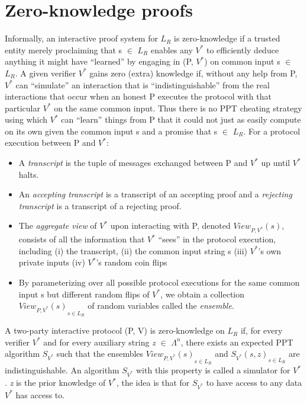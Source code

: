 \documentclass[a4paper]{article}
\newcommand{\quotes}[1]{``#1''}
\begin{document}
\section{Zero-knowledge proofs}
Informally, an interactive proof system for \textit{$L_R$} is zero-knowledge if a trusted entity merely proclaiming that s $\in$ \textit{$L_R$} enables any \textit{$V^{*}$} to efficiently deduce anything it might have \quotes{learned} by engaging in (P, ${V^{*}}$) on common input s $\in$ \textit{$L_R$}. A given verifier ${V^{*}}$ gains zero (extra) knowledge if, without any help from P, ${V^{*}}$ can \quotes{simulate} an interaction that is \quotes{indistinguishable} from the real interactions that occur when an honest P executes the protocol with that particular ${V^{*}}$ on the same common input. Thus there is no PPT cheating strategy using which ${V^{*}}$ can \quotes{learn} things from P that it could not just as easily compute on its own given the common input s and a promise that s $\in$ \textit{$L_R$}.
\newline
For a protocol execution between P and ${V^{*}}$: 
\begin{itemize}
  \item A \emph{transcript} is the tuple of messages exchanged between P and ${V^{*}}$ up until ${V^{*}}$ halts. 
  \item An \emph{accepting transcript} is a transcript of an accepting proof and a \emph{rejecting transcript} is a transcript of a rejecting proof.
  \item The \emph{aggregate view} of ${V^{*}}$ upon interacting with P, denoted $View_{P,V^{*}}(s)$, consists of all the information that ${V^{*}}$ \quotes{sees} in the protocol execution, including (i) the transcript, (ii) the common input string s (iii) ${V^{*}}$’s own private inputs (iv) ${V^{*}}$’s random coin flips  
  \item By parameterizing over all possible protocol executions for the same common input s but different random flips of ${V^{*}}$, we obtain a collection ${ View_{P,V^{*}}(s)}_{s \in L_R }$ of random variables called the \emph{ensemble}.
\end{itemize}
A two-party interactive protocol (P, V) is zero-knowledge on \textit{$L_R$} if, for every verifier ${V^{*}}$ and for every auxiliary string \textit{z} $\in$ \(\Lambda^n\), there exists an expected PPT algorithm $S_{V^{*}}$ such that the ensembles ${ View_{P,V^{*}}(s)}_{s \in L_R }$ and ${S_{V^{*}}(s,z)}_{s \in L_R }$ are indistinguishable. An algorithm $S_{V^{*}}$ with this property is called a simulator for ${V^{*}}$. \textit{z} is the prior knowledge of ${V^{*}}$, the idea is that for $S_{V^{*}}$ to have access to any data ${V^{*}}$ has access to.
\end{document}
